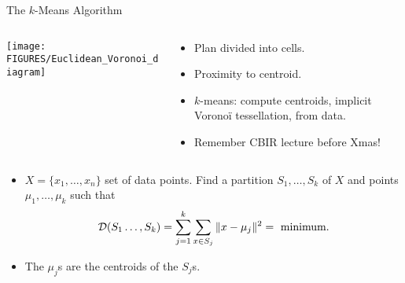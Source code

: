 \documentclass[9pt]{beamer}
\begin{document}
\begin{frame}[t]{The $k$-Means Algorithm}
  \begin{columns}
    \begin{column}{0.4\textwidth}
      \begin{center}
        \texttt{[image: FIGURES/Euclidean\_Voronoi\_diagram]}
      \end{center}
    \end{column}
    \begin{column}{0.6\textwidth}
      \begin{itemize}
      \item Plan divided into cells.
      \item Proximity to centroid.
      \item $k$-means: compute centroids, implicit Vorono{\"i} tessellation, from data.
      \item Remember CBIR lecture before Xmas!
      \end{itemize}
    \end{column}
  \end{columns}
  \begin{itemize}
  \item $X = \{x_1,\dots,x_n\}$ set of data points. Find a partition $S_1,\dots,S_k$ of $X$ and points $\mu_1,\dots,\mu_k$ such that
    $$
    {\mathcal D}(S_1\dots,S_k) = \sum_{j=1}^k\sum_{x\in S_j}\|x-\mu_j\|^2 = \text{ minimum}.
    $$
  \item The $\mu_j$s are the centroids of the $S_j$s.
  \end{itemize}
\end{frame}
\end{document}
